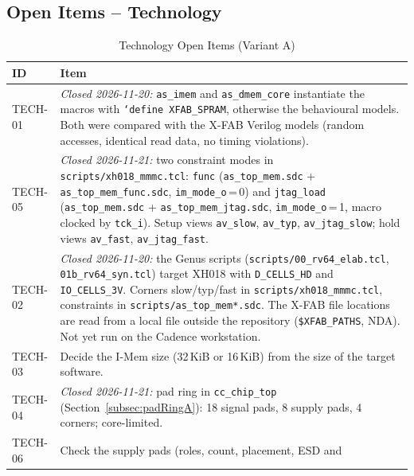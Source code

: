 \subsection{Open Items -- Technology}
\label{subsec:techOpenA}

\begin{table}[H]
\caption{Technology Open Items (Variant A)}
\label{tab:asTechOpenA}
\centering
\begin{tabularx}{\textwidth}{|l |X|}
  \hline
  ID & Item \\
  \hline
  \hline
  TECH-01 & \emph{Closed 2026-11-20:} \texttt{as\_imem} and
            \texttt{as\_dmem\_core} instantiate the macros with
            \texttt{`define XFAB\_SPRAM}, otherwise the behavioural models.
            Both were compared with the X-FAB Verilog models (random
            accesses, identical read data, no timing violations). \\
  \hline
  TECH-05 & \emph{Closed 2026-11-21:} two constraint modes in
            \texttt{scripts/xh018\_mmmc.tcl}: \texttt{func}
            (\texttt{as\_top\_mem.sdc} + \texttt{as\_top\_mem\_func.sdc},
            \texttt{im\_mode\_o}\,=\,0) and \texttt{jtag\_load}
            (\texttt{as\_top\_mem.sdc} + \texttt{as\_top\_mem\_jtag.sdc},
            \texttt{im\_mode\_o}\,=\,1, macro clocked by \texttt{tck\_i}).
            Setup views \texttt{av\_slow}, \texttt{av\_typ},
            \texttt{av\_jtag\_slow}; hold views \texttt{av\_fast},
            \texttt{av\_jtag\_fast}. \\
  \hline
  TECH-02 & \emph{Closed 2026-11-20:} the Genus scripts
            (\texttt{scripts/00\_rv64\_elab.tcl}, \texttt{01b\_rv64\_syn.tcl})
            target XH018 with \texttt{D\_CELLS\_HD} and \texttt{IO\_CELLS\_3V}.
            Corners slow/typ/fast in \texttt{scripts/xh018\_mmmc.tcl},
            constraints in \texttt{scripts/as\_top\_mem*.sdc}. The X-FAB file
            locations are read from a local file outside the repository
            (\texttt{\$XFAB\_PATHS}, NDA). Not yet run on the Cadence
            workstation. \\
  \hline
  TECH-03 & Decide the I-Mem size (32\,KiB or 16\,KiB) from the size of the
            target software. \\
  \hline
  TECH-04 & \emph{Closed 2026-11-21:} pad ring in \texttt{cc\_chip\_top}
            (Section~\ref{subsec:padRingA}): 18 signal pads, 8 supply pads,
            4 corners; core-limited. \\
  \hline
  TECH-06 & Check the supply pads (roles, count, placement, ESD and

\end{tabularx}
\end{table}
